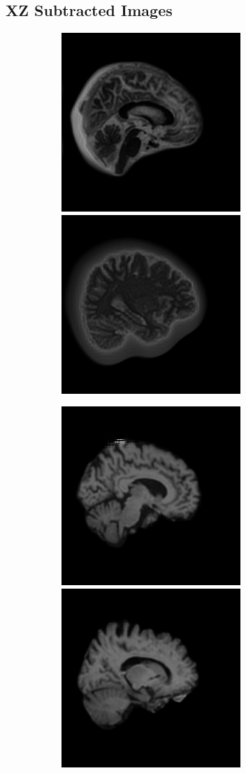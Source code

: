 \documentclass[12pt, fleqn, titlepage]{article}
\newcommand\skipper{1.4pt}
\newcommand\ripper{2.5pt}
\begin{document}
\subsection{XZ Subtracted Images}\label{xz_subtracted_images}
\begin{figure}[H]
	\centering
	\begin{subfigure}[b]{0.7\textwidth}
		\centering
		\includegraphics[width=0.30\linewidth]{imgs/1.5T_bilinear}
		\hskip\skipper
		\includegraphics[width=0.30\linewidth]{imgs/3T_bilinear}
	\end{subfigure}
	\vskip\ripper
	\begin{subfigure}[b]{0.7\textwidth}
		\centering
		\includegraphics[width=0.30\linewidth]{imgs/1.5T_no_noise}
		\hskip\skipper
		\includegraphics[width=0.30\linewidth]{imgs/3T_no_noise}
	\end{subfigure}
\end{figure}
\end{document}
